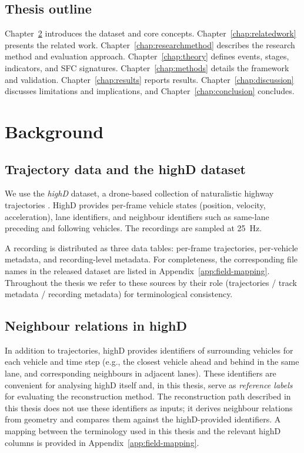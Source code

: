 \documentclass[12pt,a4paper,twoside,openright]{report}
\begin{document}
    \section{Thesis outline}

    Chapter~\ref{chap:background} introduces the dataset and core concepts. Chapter~\ref{chap:relatedwork} presents the related work. Chapter~\ref{chap:researchmethod} describes the research method and evaluation approach. Chapter~\ref{chap:theory} defines events, stages, indicators, and SFC signatures. Chapter~\ref{chap:methods} details the framework and validation. Chapter~\ref{chap:results} reports results. Chapter~\ref{chap:discussion} discusses limitations and implications, and Chapter~\ref{chap:conclusion} concludes.

    \chapter{Background}
    \label{chap:background}

    \section{Trajectory data and the highD dataset}
    We use the \textit{highD} dataset, a drone-based collection of naturalistic highway trajectories \cite{highd_2018}. HighD provides per-frame vehicle states (position, velocity, acceleration), lane identifiers, and neighbour identifiers such as same-lane preceding and following vehicles. The recordings are sampled at \SI{25}{\hertz}.

    A recording is distributed as three data tables: per-frame trajectories, per-vehicle metadata, and recording-level metadata. For completeness, the corresponding file names in the released dataset are listed in Appendix~\ref{app:field-mapping}. Throughout the thesis we refer to these sources by their role (trajectories / track metadata / recording metadata) for terminological consistency.



    \section{Neighbour relations in highD}
    In addition to trajectories, highD provides identifiers of surrounding vehicles for each vehicle and time step (e.g., the closest vehicle ahead and behind in the same lane, and corresponding neighbours in adjacent lanes). These identifiers are convenient for analysing highD itself and, in this thesis, serve as \emph{reference labels} for evaluating the reconstruction method. The reconstruction path described in this thesis does not use these identifiers as inputs; it derives neighbour relations from geometry and compares them against the highD-provided identifiers. A mapping between the terminology used in this thesis and the relevant highD columns is provided in Appendix~\ref{app:field-mapping}.
\end{document}
